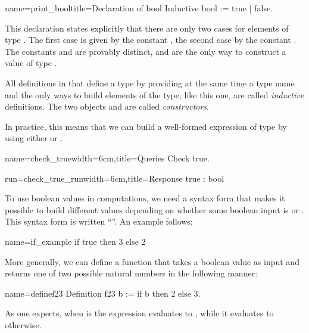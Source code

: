 \begin{coq}{name=print_bool}{title=Declaration of bool}
Inductive bool := true | false.
\end{coq}
This declaration states explicitly that there are only two cases for
elements of type .  The first case is given by the constant
, the second case by the constant .  
The constants  and  are provably distinct, and
are the only way to construct a value of type .

All definitions
in \Coq{} that define a type by providing at the same time a type
name and the only ways to build elements of the type, like this one,
are called {\em inductive}
definitions.  The two objects  and  are called
\emph{constructors}.

In practice, this means that we can build a well-formed expression of
type  by using either  or . 

\begin{coq}{name=check_true}{width=6cm,title=Queries}
Check true.
\end{coq}
\begin{coqout}{run=check_true_run}{width=6cm,title=Response}
true : bool
\end{coqout}

To use boolean values in computations, we need a syntax form that makes
it possible to build different values depending on whether some
boolean input is  or .  This syntax form is written
``''.  An example follows:

\begin{coq}{name=if_example}{}
if true then 3 else 2
\end{coq}
More generally, we can define a function that takes a boolean value as
input and returns one of two possible natural numbers in the following
manner:

\begin{coq}{name=definef23}{}
Definition f23 b := if b then 2 else 3.
\end{coq}

As one expects, when  is  the expression
 evaluates to , while it evaluates to  otherwise.

